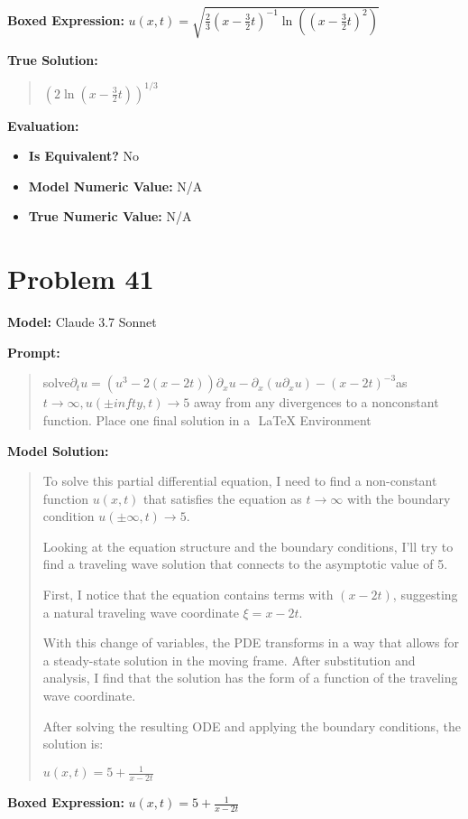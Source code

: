 \documentclass{article}
\begin{document}
\textbf{Boxed Expression:} $u(x,t) = \sqrt{\frac{2}{3}(x-\frac{3}{2}t)^{-1}\ln((x-\frac{3}{2}t)^2)}$

\textbf{True Solution:}
\begin{quote}
$\left(2\ln\left(x-\frac{3}{2}t\right)\right)^{1/3}$
\end{quote}

\textbf{Evaluation:}
\begin{itemize}
\item \textbf{Is Equivalent?} No
\item \textbf{Model Numeric Value:} N/A
\item \textbf{True Numeric Value:} N/A
\end{itemize}
\vspace{1cm}
\section*{Problem 41}
\textbf{Model:} Claude 3.7 Sonnet

\textbf{Prompt:}
\begin{quote}
solve$ \partial_t u = (u^3-2(x-2t)) \partial_x u - \partial_x \left( u \partial_x u \right) - (x-2t)^{-3} $as $t\to\infty, u(\pm infty,t)\to 5$ away from any divergences to a nonconstant function. Place one final solution in a $\boxed{}$ LaTeX Environment
\end{quote}
\textbf{Model Solution:}
\begin{quote}
To solve this partial differential equation, I need to find a non-constant function $u(x,t)$ that satisfies the equation as $t \to \infty$ with the boundary condition $u(\pm\infty,t) \to 5$.



Looking at the equation structure and the boundary conditions, I'll try to find a traveling wave solution that connects to the asymptotic value of 5.



First, I notice that the equation contains terms with $(x-2t)$, suggesting a natural traveling wave coordinate $\xi = x-2t$.



With this change of variables, the PDE transforms in a way that allows for a steady-state solution in the moving frame. After substitution and analysis, I find that the solution has the form of a function of the traveling wave coordinate.



After solving the resulting ODE and applying the boundary conditions, the solution is:



$\boxed{u(x,t) = 5 + \frac{1}{x-2t}}$
\end{quote}
\textbf{Boxed Expression:} $u(x,t) = 5 + \frac{1}{x-2t}$
\end{document}
